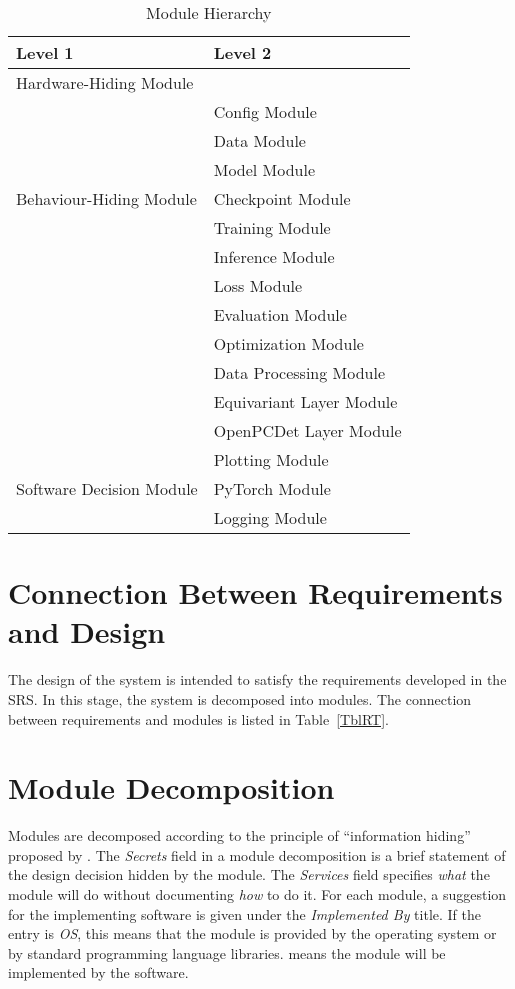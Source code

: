 \documentclass[12pt, titlepage]{article}
\begin{document}
\begin{table}[h!]
\centering
\begin{tabular}{p{} p{}}
\toprule
\textbf{Level 1} & \textbf{Level 2}\\
\midrule

{Hardware-Hiding Module} & ~ \\
\midrule

\multirow{7}{0.3\textwidth}{Behaviour-Hiding Module} 
& Config Module\\
& Data Module\\
& Model Module\\
& Checkpoint Module\\
& Training Module\\
& Inference Module\\
& Loss Module\\ 
& Evaluation Module\\
& Optimization Module\\
& Data Processing Module\\
& Equivariant Layer Module\\
& OpenPCDet Layer Module\\
\midrule

\multirow{3}{0.3\textwidth}{Software Decision Module}
& Plotting Module\\
& PyTorch Module\\
& Logging Module\\
\bottomrule

\end{tabular}
\caption{Module Hierarchy}
\label{TblMH}
\end{table}

\section{Connection Between Requirements and Design} \label{SecConnection}

The design of the system is intended to satisfy the requirements developed in
the SRS. In this stage, the system is decomposed into modules. The connection
between requirements and modules is listed in Table~\ref{TblRT}.

\section{Module Decomposition} \label{SecMD}

Modules are decomposed according to the principle of ``information hiding''
proposed by \citet{ParnasEtAl1984}. The \emph{Secrets} field in a module
decomposition is a brief statement of the design decision hidden by the
module. The \emph{Services} field specifies \emph{what} the module will do
without documenting \emph{how} to do it. For each module, a suggestion for the
implementing software is given under the \emph{Implemented By} title. If the
entry is \emph{OS}, this means that the module is provided by the operating
system or by standard programming language libraries.  \emph{\progname{}} means the
module will be implemented by the \progname{} software.
\end{document}

